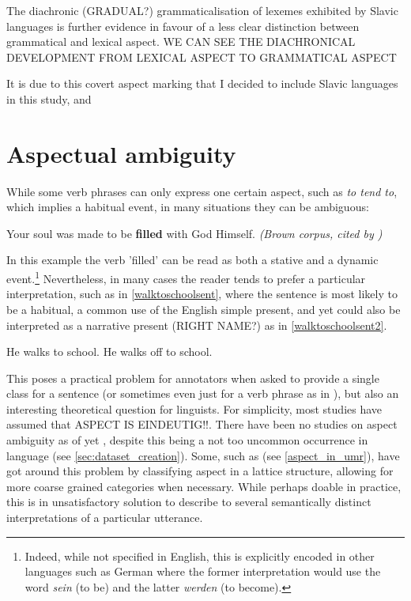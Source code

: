 The diachronic (GRADUAL?) grammaticalisation of lexemes exhibited by Slavic languages is further evidence in favour of a less clear distinction between grammatical and lexical aspect.
WE CAN SEE THE DIACHRONICAL DEVELOPMENT FROM LEXICAL ASPECT TO GRAMMATICAL ASPECT

It is due to this covert aspect marking that I decided to include Slavic languages in this study, and 


\section{Aspectual ambiguity}
While some verb phrases can only express one certain aspect, such as \emph{to tend to}, which implies a habitual event, in many situations they can be ambiguous:
\begin{exe}
    \ex Your soul was made to be \textbf{filled} with God Himself. \emph{(Brown corpus, cited by \citet{Friedrich2014AutomaticPO})}
\end{exe}
In this example the verb 'filled' can be read as both a stative and a dynamic event.\footnote{Indeed, while not specified in English, this is explicitly encoded in other languages such as German where the former interpretation would use the word \emph{sein} (to be) and the latter \emph{werden} (to become).} Nevertheless, in many cases the reader tends to prefer a particular interpretation, such as in \ref{walktoschoolsent}, where the sentence is most likely to be a habitual, a common use of the English simple present, and yet could also be interpreted as a narrative present (RIGHT NAME?) as in \ref{walktoschoolsent2}.

\begin{exe}
    \ex He walks to school.
    \label{walktoschoolsent}
    \ex He walks off to school.
    \label{walktoschoolsent2}
\end{exe}


This poses a practical problem for annotators when asked to provide a single class for a sentence (or sometimes even just for a verb phrase as in \citet{siegel-mckeown-2000-learning}), but also an interesting theoretical question for linguists. For simplicity, most studies have assumed that ASPECT IS EINDEUTIG!!. There have been no studies on aspect ambiguity as of yet \citep{friedrich-etal-2023-kind}, despite this being a not too uncommon occurrence in language (see \ref{sec:dataset_creation}). Some, such as \citet{umr} (see \ref{aspect_in_umr}), have got around this problem by classifying aspect in a lattice structure, allowing for more coarse grained categories when necessary. While perhaps doable in practice, this is in unsatisfactory solution to describe to several semantically distinct interpretations of a particular utterance.

